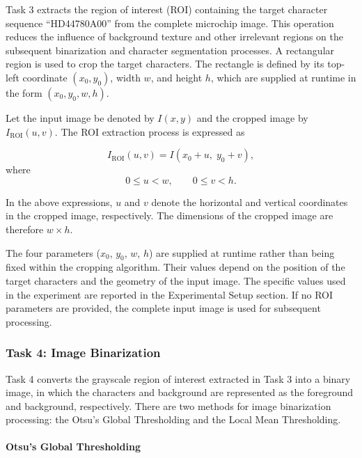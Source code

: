 \documentclass[conference]{IEEEtran}
\begin{document}
Task 3 extracts the region of interest (ROI) containing the target
character sequence ``HD44780A00'' from the complete microchip image.
This operation reduces the influence of background texture and other
irrelevant regions on the subsequent binarization and character
segmentation processes. A rectangular region is used to crop the target
characters. The rectangle is defined by its top-left coordinate
$(x_0,y_0)$, width $w$, and height $h$, which are supplied at runtime
in the form $(x_0,y_0,w,h)$.

Let the input image be denoted by $I(x,y)$ and the cropped image by
$I_{\mathrm{ROI}}(u,v)$. The ROI extraction process is expressed as

\begin{equation}
I_{\mathrm{ROI}}(u,v)
=
I(x_0+u,\;y_0+v),
\label{eq:roi_extraction}
\end{equation}
where
\begin{equation}
0 \leq u < w,
\qquad
0 \leq v < h.
\label{eq:roi_coordinates}
\end{equation}

In the above expressions, $u$ and $v$ denote the horizontal and
vertical coordinates in the cropped image, respectively. The dimensions
of the cropped image are therefore $w\times h$. 

The four parameters ($x_0$, $y_0$, $w$, $h$) are supplied at runtime rather than being fixed
within the cropping algorithm. Their values depend on the position of
the target characters and the geometry of the input image. The
specific values used in the experiment are reported in the
Experimental Setup section. If no ROI parameters are provided, the
complete input image is used for subsequent processing.

\subsubsection{Task 4: Image Binarization}

Task 4 converts the grayscale region of interest extracted in Task 3
into a binary image, in which the characters and background are
represented as the foreground and background, respectively. There are two methods for image binarization processing: the Otsu's Global Thresholding and the Local Mean Thresholding.

\paragraph{Otsu's Global Thresholding}
\end{document}
